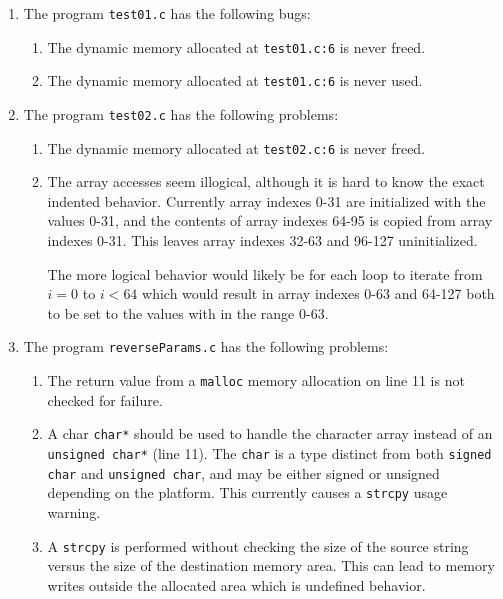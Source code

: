 \begin{enumerate}

\item The program \texttt{test01.c} has the following bugs:

\begin{enumerate}[label=Bug \#\arabic*:]
\item
The dynamic memory allocated at \texttt{test01.c:6} is never freed.
\item
The dynamic memory allocated at \texttt{test01.c:6} is never used.
\end{enumerate}

\item The program \texttt{test02.c} has the following problems:

\begin{enumerate}[label=Problem \#\arabic*:]
\item
The dynamic memory allocated at \texttt{test02.c:6} is never freed.
\item
The array accesses seem illogical, although it is hard to know the exact indented behavior. Currently array indexes 0-31 are initialized with the values 0-31, and the contents of array indexes 64-95 is copied from array indexes 0-31. This leaves array indexes 32-63 and 96-127 uninitialized.

The more logical behavior would likely be for each loop to iterate from $i=0$ to $i<64$ which would result in array indexes 0-63 and 64-127 both to be set to the values with in the range 0-63.
\end{enumerate}

\item The program \texttt{reverseParams.c} has the following problems:

\begin{enumerate}[label=Problem \#\arabic*:]
\item
The return value from a \texttt{malloc} memory allocation on line 11 is not checked for failure.

\item
A char \texttt{char*} should be used to handle the character array instead of an \texttt{unsigned char*} (line 11). The \texttt{char} is a type distinct from both \texttt{signed char} and \texttt{unsigned char}, and may be either signed or unsigned depending on the platform. This currently causes a \texttt{strcpy} usage warning.

\item
A \texttt{strcpy} is performed without checking the size of the source string versus the size of the destination memory area. This can lead to memory writes outside the allocated area which is undefined behavior.


\end{enumerate}
\end{enumerate}
